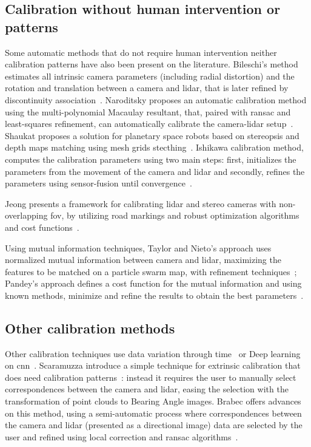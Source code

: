 \subsection{Calibration without human intervention or patterns}
Some automatic methods that do not require human intervention neither calibration patterns have also been present on the literature. Bileschi's method estimates all intrinsic camera parameters  (including radial distortion) and the rotation and translation between a camera and \ac{lidar}, that is later refined by discontinuity association~\cite{Bileschi2009}. Naroditsky \etal proposes an automatic calibration method using the multi-polynomial Macaulay resultant, that, paired with \ac{ransac} and least-squares refinement, can automatically calibrate the camera-\ac{lidar} setup~\cite{Naroditsky2011}. Shaukat proposes a solution for planetary space robots based on  stereopsis and depth maps matching using mesh grids stecthing~\cite{Shaukat2016}. Ishikawa \etal calibration method, computes the calibration parameters using two main steps: first, initializes the parameters from the movement of the camera and \ac{lidar} and secondly, refines the parameters using sensor-fusion until convergence~\cite{Ishikawa2018}. 

Jeong \etal presents a framework for calibrating \ac{lidar} and stereo cameras with non-overlapping \ac{fov}, by utilizing road markings and robust optimization algorithms and cost functions~\cite{Jeong2019}.

Using mutual information techniques, Taylor and Nieto's approach uses normalized mutual information between camera and \ac{lidar}, maximizing the features to be matched on a particle swarm map, with refinement techniques~\cite{Taylor2013}; Pandey's \etal approach defines a cost function for the mutual information and using known methods, minimize and refine the results to obtain the best parameters~\cite{Pandey2012}.


\subsection{Other calibration methods}
Other calibration techniques use data variation through time~\cite{Chien2017} or Deep learning on \ac{cnn}~\cite{Wang2018a}. Scaramuzza \etal introduce a simple technique for extrinsic calibration that does need calibration patterns~\cite{Scaramuzza}: instead it requires the user to manually select correspondences between the camera and \ac{lidar}, easing the selection with the transformation of point clouds to Bearing Angle images. Brabec offers advances on this method, using a semi-automatic process where correspondences between the camera and \ac{lidar} (presented as a directional image) data are selected by the user and refined using local correction and \ac{ransac} algorithms~\cite{brabec2014}.

